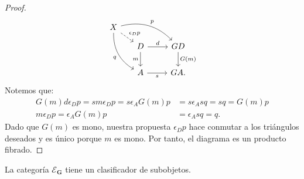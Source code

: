 \begin{proof}
\begin{equation*}
\begin{tikzcd}
      X\ar[bend left=30]{rrd}{p}\ar[bend right=30]{rdd}[swap]{q}
          \ar[dashed]{rd}{\epsilon_Dp}\\[-2ex]
      & [-2ex] D\ar{r}{d}\ar[swap]{d}{m} & GD\ar{d}{G(m)} \\
      & A\ar[swap]{r}{s} & GA.
    \end{tikzcd}
  \end{equation*}
  Notemos que:
  \begin{align*}
    G(m)d\epsilon_Dp = sm\epsilon_Dp = s\epsilon_AG(m)p &= s\epsilon_Asq = sq = G(m)p \\
    m\epsilon_Dp = \epsilon_AG(m)p &= \epsilon_Asq = q.
  \end{align*}
  Dado que $G(m)$ es mono, nuestra propuesta $\epsilon_Dp$ hace conmutar a los triángulos deseados
  y es único porque $m$ es mono. Por tanto, el diagrama es un producto fibrado.
\end{proof}
\begin{lemma}
  La categoría $\mathcal{E}_\textbf{G}$ tiene un clasificador de subobjetos.
\end{lemma}
